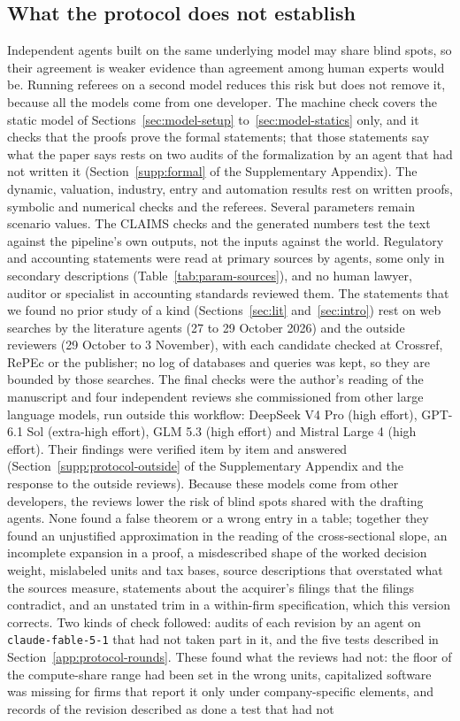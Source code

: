 \subsection{What the protocol does not establish}
Independent agents built on the same underlying model may share blind spots, so their agreement is weaker evidence than agreement among human experts would be. Running referees on a second model reduces this risk but does not remove it, because all the models come from one developer. The machine check covers the static model of Sections~\ref{sec:model-setup} to~\ref{sec:model-statics} only, and it checks that the proofs prove the formal statements; that those statements say what the paper says rests on two audits of the formalization by an agent that had not written it (Section~\ref{supp:formal} of the Supplementary Appendix). The dynamic, valuation, industry, entry and automation results rest on written proofs, symbolic and numerical checks and the referees. Several parameters remain scenario values. The CLAIMS checks and the generated numbers test the text against the pipeline's own outputs, not the inputs against the world. Regulatory and accounting statements were read at primary sources by agents, some only in secondary descriptions (Table~\ref{tab:param-sources}), and no human lawyer, auditor or specialist in accounting standards reviewed them. The statements that we found no prior study of a kind (Sections~\ref{sec:lit} and~\ref{sec:intro}) rest on web searches by the literature agents (27 to 29 October 2026) and the outside reviewers (29 October to 3 November), with each candidate checked at Crossref, RePEc or the publisher; no log of databases and queries was kept, so they are bounded by those searches. The final checks were the author's reading of the manuscript and four independent reviews she commissioned from other large language models, run outside this workflow: DeepSeek V4 Pro (high effort), GPT-6.1 Sol (extra-high effort), GLM 5.3 (high effort) and Mistral Large 4 (high effort). Their findings were verified item by item and answered (Section~\ref{supp:protocol-outside} of the Supplementary Appendix and the response to the outside reviews). Because these models come from other developers, the reviews lower the risk of blind spots shared with the drafting agents. None found a false theorem or a wrong entry in a table; together they found an unjustified approximation in the reading of the cross-sectional slope, an incomplete expansion in a proof, a misdescribed shape of the worked decision weight, mislabeled units and tax bases, source descriptions that overstated what the sources measure, statements about the acquirer's filings that the filings contradict, and an unstated trim in a within-firm specification, which this version corrects. Two kinds of check followed: audits of each revision by an agent on \texttt{claude-fable-5-1} that had not taken part in it, and the five tests described in Section~\ref{app:protocol-rounds}. These found what the reviews had not: the floor of the compute-share range had been set in the wrong units, capitalized software was missing for \CapswKeptFirms{} firms that report it only under company-specific elements, and records of the revision described as done a test that had not 